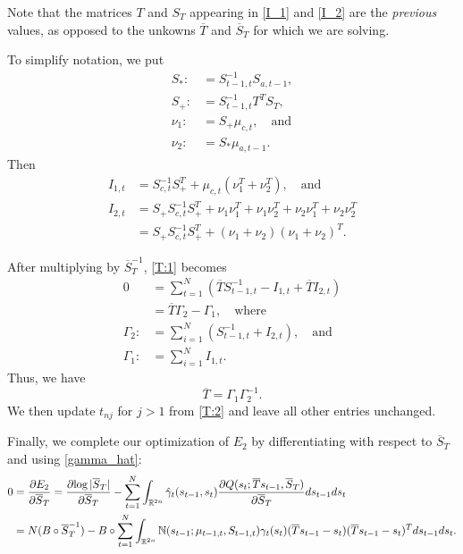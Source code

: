 \documentclass[12pt,leqno]{article}
\begin{document}
Note that the matrices $T$ and $S_T$ appearing in \eqref{I_1} and \eqref{I_2} are the {\em previous}
values, as opposed to the unkowns $\overline{T}$ and $\overline{S}_T$ for which we are solving.

To simplify notation, we put
\begin{align*}
S_* :&= S_{t-1,t}^{-1}S_{a,t-1},\\
S_+ :&= S_{t-1,t}^{-1}T^TS_T,\\
\nu_1 :&= S_+\mu_{c,t},\quad\text{and}\\
\nu_2 :&= S_*\mu_{a,t-1}.
\end{align*}
Then
\begin{align*}
  I_{1,t} &= S_{c,t}^{-1}S_+^T +\mu_{c,t}(\nu_1^T + \nu_2^T), \quad\text{and}\\
  I_{2,t} &= S_+S_{c,t}^{-1}S_+^T+\nu_1\nu_1^T + \nu_1\nu_2^T + \nu_2\nu_1^T + \nu_2\nu_2^T \\
      &= S_+S_{c,t}^{-1}S_+^T + (\nu_1+\nu_2)(\nu_1+\nu_2)^T.
\end{align*}

After multiplying by $\overline{S}_T^{-1}$, \eqref{T:1} becomes
\begin{align*}
 0 &= \sum_{t=1}^N\left(\overline{T}S_{t-1,t}^{-1} - I_{1,t} + \overline{T}I_{2,t}\right)\\
  &= \overline{T}\Gamma_2 - \Gamma_1, \quad\text{where} \\
  \Gamma_2 :&= \sum_{i=1}^N(S_{t-1,t}^{-1} + I_{2,t}),\quad\text{and}\\
  \Gamma_1 :&= \sum_{i=1}^NI_{1,t}.
\end{align*}
Thus,  we have
\begin{equation}\label{T:2}
  \overline{T} = \Gamma_1\Gamma_2^{-1}.
\end{equation}
We then update $t_{nj}$ for $j > 1$ from \eqref{T:2} and leave all other entries unchanged.

Finally, we complete our optimization of $E_2$ by differentiating with respect to $\overline{S}_T$ and using \eqref{gamma_hat}:
\begin{equation}\label{Sigma_Tr:0}
  \begin{split}
  0 &= \frac{\partial{E_2}}{\partial{\overline{S}_T}} = \frac{\partial{\log|\overline{S}_T|}}{\partial\overline{S}_T}
  - \sum_{t=1}^N\int_{{\mathbb R}^{2n}}\hat{\gamma}_t(s_{t-1},s_t)\frac{\partial{Q(s_t;\overline{T}s_{t-1},\overline{S}_T)}}
  {\partial\overline{S}_T}ds_{t-1}ds_t \\
  &= N(B\circ\overline{S}_T^{-1}) -B\circ\sum_{t=1}^N\int_{{\mathbb R}^{2n}}{\mathbb N}(s_{t-1};\mu_{t-1,t},S_{t-1,t})
  \gamma_t(s_t)(\overline{T}s_{t-1}-s_t)(\overline{T}s_{t-1}-s_t)^Tds_{t-1}ds_t.
  \end{split}
\end{equation}
\end{document}
